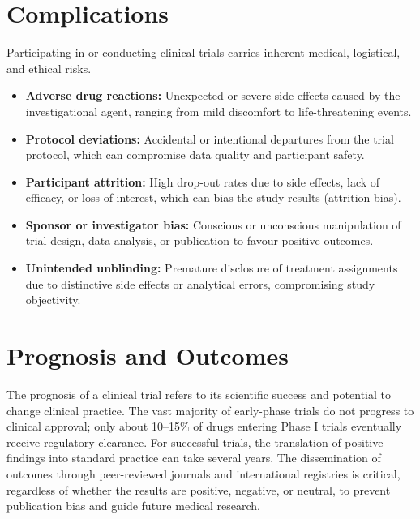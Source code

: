 \section*{Complications}
Participating in or conducting clinical trials carries inherent medical, logistical, and ethical risks.
\begin{itemize}
    \item \textbf{Adverse drug reactions:} Unexpected or severe side effects caused by the investigational agent, ranging from mild discomfort to life-threatening events.
    \item \textbf{Protocol deviations:} Accidental or intentional departures from the trial protocol, which can compromise data quality and participant safety.
    \item \textbf{Participant attrition:} High drop-out rates due to side effects, lack of efficacy, or loss of interest, which can bias the study results (attrition bias).
    \item \textbf{Sponsor or investigator bias:} Conscious or unconscious manipulation of trial design, data analysis, or publication to favour positive outcomes.
    \item \textbf{Unintended unblinding:} Premature disclosure of treatment assignments due to distinctive side effects or analytical errors, compromising study objectivity.
\end{itemize}

\section*{Prognosis and Outcomes}
The prognosis of a clinical trial refers to its scientific success and potential to change clinical practice. The vast majority of early-phase trials do not progress to clinical approval; only about 10--15\% of drugs entering Phase I trials eventually receive regulatory clearance. For successful trials, the translation of positive findings into standard practice can take several years. The dissemination of outcomes through peer-reviewed journals and international registries is critical, regardless of whether the results are positive, negative, or neutral, to prevent publication bias and guide future medical research.


